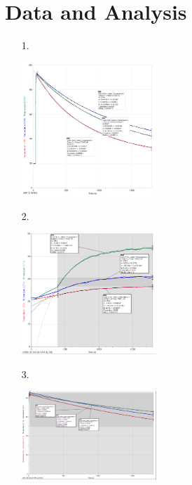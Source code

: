 ﻿\documentclass[12pt, letterpaper]{article}
\begin{document}
    \section*{Data and Analysis}
    \begin{enumerate}
        \item [1.]\mbox{}
        \begin{mdframed}
            \begin{center}
                \includegraphics[width=0.4\textwidth]{Untitled.png}
            \end{center}
        \end{mdframed}

        \item [2.]\mbox{}
        \begin{mdframed}
            \begin{center}
                \includegraphics[width=0.4\textwidth]{thermal.png}
            \end{center}
        \end{mdframed}

        \item [3.]\mbox{}
        \begin{mdframed}
            \begin{center}
                \includegraphics[width=0.4\textwidth]{insulated.png}
            \end{center}
        \end{mdframed}
    \end{enumerate}
\end{document}
